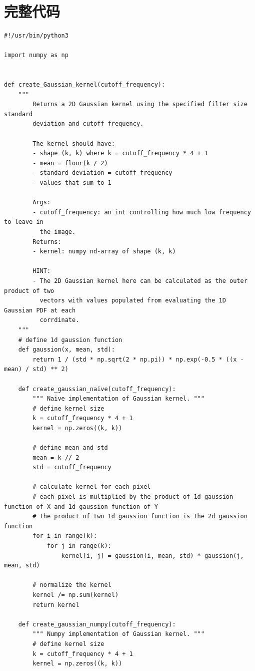 \appendix

\section{完整代码}

\begin{lstlisting}[style=Python]
#!/usr/bin/python3

import numpy as np


def create_Gaussian_kernel(cutoff_frequency):
    """
        Returns a 2D Gaussian kernel using the specified filter size standard
        deviation and cutoff frequency.

        The kernel should have:
        - shape (k, k) where k = cutoff_frequency * 4 + 1
        - mean = floor(k / 2)
        - standard deviation = cutoff_frequency
        - values that sum to 1

        Args:
        - cutoff_frequency: an int controlling how much low frequency to leave in
          the image.
        Returns:
        - kernel: numpy nd-array of shape (k, k)

        HINT:
        - The 2D Gaussian kernel here can be calculated as the outer product of two
          vectors with values populated from evaluating the 1D Gaussian PDF at each
          corrdinate.
    """
    # define 1d gaussion function
    def gaussion(x, mean, std):
        return 1 / (std * np.sqrt(2 * np.pi)) * np.exp(-0.5 * ((x - mean) / std) ** 2)
    
    def create_gaussian_naive(cutoff_frequency):
        """ Naive implementation of Gaussian kernel. """
        # define kernel size
        k = cutoff_frequency * 4 + 1
        kernel = np.zeros((k, k))

        # define mean and std
        mean = k // 2
        std = cutoff_frequency
        
        # calculate kernel for each pixel
        # each pixel is multiplied by the product of 1d gaussion function of X and 1d gaussion function of Y
        # the product of two 1d gaussion function is the 2d gaussion function
        for i in range(k):
            for j in range(k):
                kernel[i, j] = gaussion(i, mean, std) * gaussion(j, mean, std)
        
        # normalize the kernel
        kernel /= np.sum(kernel)
        return kernel
    
    def create_gaussian_numpy(cutoff_frequency):
        """ Numpy implementation of Gaussian kernel. """
        # define kernel size
        k = cutoff_frequency * 4 + 1
        kernel = np.zeros((k, k))


\end{lstlisting}
